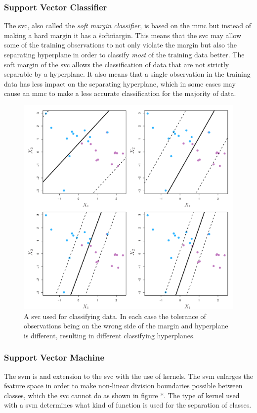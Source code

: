 \documentclass[11pt]{article}
\begin{document}
\subsubsection{Support Vector Classifier}
The \gls{svc}, also called the \textit{soft margin classifier}, is based on the \gls{mmc} but instead of making a hard margin it has a \"soft\" margin. This means that the \gls{svc} may allow some of the training observations to not only violate the margin but also the separating hyperplane in order to classify \textit{most} of the training data better. The soft margin of the \gls{svc} allows the classification of data that are not strictly separable by a hyperplane. It also means that a single observation in the training data has less impact on the separating hyperplane, which in some cases may cause an \gls{mmc} to make a less accurate classification for the majority of data.\cite{jamesSupportVectorMachines}

\begin{figure}[ht]
  \centering
  \includegraphics[width=12cm]{graphics/9_7.pdf}
  \caption{A \gls{svc} used for classifying data. In each case the tolerance of observations being on the wrong side of the margin and hyperplane is different, resulting in different classifying hyperplanes.}
\end{figure}

\subsubsection{Support Vector Machine}
The \gls{svm} is and extension to the \gls{svc} with the use of kernels. The \gls{svm} enlarges the feature space in order to make non-linear division boundaries possible between classes, which the \gls{svc} cannot do as shown in figure *. The type of kernel used with a \gls{svm}\cite{KernelMethod2021} determines what kind of function is used for the separation of classes\cite{SVMKernelsScikitlearn24}.\cite{jamesSupportVectorMachines}
\end{document}
